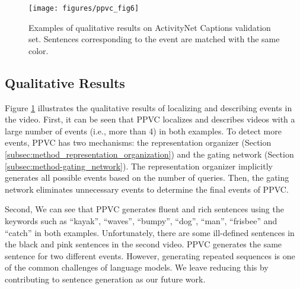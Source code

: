 %

\begin{figure}[!tp]
  \centering
  \texttt{[image: figures/ppvc\_fig6]}
  \caption{
    Examples of qualitative results on ActivityNet Captions validation set.
    Sentences corresponding to the event are matched with the same color.
  }
  \label{fig:eval_qualitative_results}
\end{figure}

\subsection{Qualitative Results}
\label{subsec:experiments-qual_res}

Figure \ref{fig:eval_qualitative_results} illustrates the qualitative results of localizing and describing events in the video.
First, it can be seen that PPVC localizes and describes videos with a large number of events (i.e., more than 4) in both examples.
To detect more events, PPVC has two mechanisms: the representation organizer (Section \ref{subsec:method_representation_organization}) and the gating network (Section \ref{subsec:method-gating_network}).
The representation organizer implicitly generates all possible events based on the number of queries.
Then, the gating network eliminates unnecessary events to determine the final events of PPVC.

Second, We can see that PPVC generates fluent and rich sentences using the keywords such as ``kayak'', ``waves'', ``bumpy'', ``dog'', ``man'', ``frisbee'' and ``catch'' in both examples.
Unfortunately, there are some ill-defined sentences in the black and pink sentences in the second video.
PPVC generates the same sentence for two different events.
However, generating repeated sequences is one of the common challenges of language models.
We leave reducing this by contributing to sentence generation as our future work.